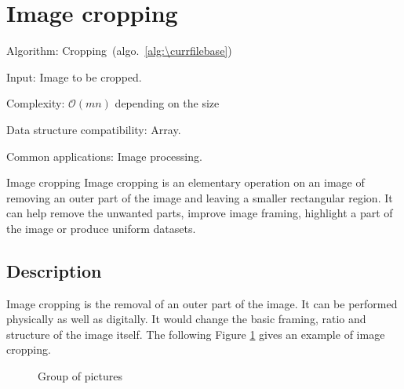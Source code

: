 \documentclass[catalog.tex]{subfiles}
\begin{document}
\def\pbname{Image cropping} %

\section{\pbname} 

\begin{overview}
\item [Algorithm:] Cropping~(algo.~\ref{alg:\currfilebase}) 
\item [Input:] Image to be cropped.
\item [Complexity:] $\mathcal{O}(mn)$ depending on the size %
\item [Data structure compatibility:] Array.
\item [Common applications:] Image processing.
\end{overview}


\begin{problem}{\pbname}
	Image cropping is an elementary operation on an image of removing an outer part of the image and leaving a smaller rectangular region. It can help remove the unwanted parts, improve image framing, highlight a part of the image or produce uniform datasets.
\end{problem}


\subsection*{Description}

Image cropping is the removal of an outer part of the image. It can be performed physically as well as digitally. It would change the basic framing, ratio and structure of the image itself. The following Figure \ref{fig:\currfilebase_group} gives an example of image cropping.

\begin{figure}[!htb]
    \centering
	\hspace{2cm} %
	\caption{Group of pictures}
	\label{fig:\currfilebase_group}
\end{figure}
\end{document}
